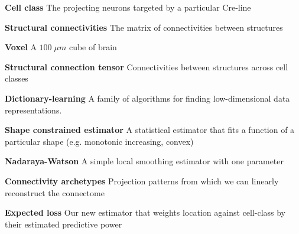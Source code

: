 \documentclass[NETN,manuscript]{stjour-new}
\begin{document}
\textbf{Cell class} The projecting neurons targeted by a particular Cre-line

\textbf{Structural connectivities} The matrix of connectivities between structures

\textbf{Voxel} A $100 \; \mu m$ cube of brain

\textbf{Structural connection tensor}  Connectivities between structures across cell classes

\textbf{Dictionary-learning} A family of algorithms for finding low-dimensional data representations.

\textbf{Shape constrained estimator} A statistical estimator that fits a function of a particular shape (e.g. monotonic increasing, convex)

\textbf{Nadaraya-Watson} A simple local smoothing estimator with one parameter

\textbf{Connectivity archetypes} Projection patterns from which we can linearly reconstruct the connectome

 \textbf{Expected loss} Our new estimator that weights location against cell-class by their estimated predictive power
 


\end{document}
